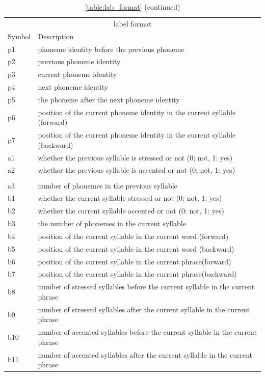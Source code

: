 \singlespacing
\begin{longtable}[!htpb]{p{} p{}}
\toprule
\multicolumn{2}{c}{label format} \\
\cline{1-2}
Symbol    & Description \\
\midrule
p1      & phoneme identity before the previous phoneme \\
p2      & previous phoneme identity \\
p3      & current phoneme identity \\
p4		& next phoneme identity \\
p5		& the phoneme after the next phoneme identity \\
p6		& position of the current phoneme identity in the current syllable (forward) \\
p7		& position of the current phoneme identity in the current syllable (backward) \\
\midrule
a1 & whether the previous syllable is stressed or not (0; not, 1: yes)\\
a2 & whether the previous syllable is accented or not (0; not, 1: yes)\\
\caption*{\tablename{} \ref{table:lab_format} (continued)}\\
\toprule
a3 & number of phonemes in the previous syllable \\
b1 & whether the current syllable stressed or not (0: not, 1: yes)\\
b2 & whether the current syllable accented or not (0: not, 1: yes)\\
b3 & the number of phonemes in the current syllable\\
b4 & position of the current syllable in the current word (forward)\\
b5 & position of the current syllable in the current word (backward)\\
b6 & position of the current syllable in the current phrase(forward)\\
b7 & position of the current syllable in the current phrase(backward)\\
b8 & number of stressed syllables before the current syllable in the current phrase\\
b9 & number of stressed syllables after the current syllable in the current phrase\\
b10 & number of accented syllables before the current syllable in the current phrase\\
b11 & number of accented syllables after the current syllable in the current phrase\\

\end{longtable}
